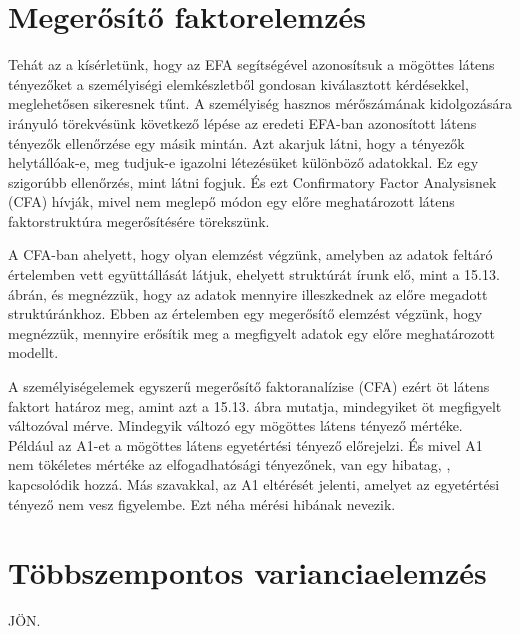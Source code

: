 \documentclass[
  letterpaper,
]{krantz}
\begin{document}

\hypertarget{sec-megerosito-faktorelemzes}{%
\chapter{Megerősítő faktorelemzés}\label{sec-megerosito-faktorelemzes}}

Tehát az a kísérletünk, hogy az EFA segítségével azonosítsuk a mögöttes
látens tényezőket a személyiségi elemkészletből gondosan kiválasztott
kérdésekkel, meglehetősen sikeresnek tűnt. A személyiség hasznos
mérőszámának kidolgozására irányuló törekvésünk következő lépése az
eredeti EFA-ban azonosított látens tényezők ellenőrzése egy másik
mintán. Azt akarjuk látni, hogy a tényezők helytállóak-e, meg tudjuk-e
igazolni létezésüket különböző adatokkal. Ez egy szigorúbb ellenőrzés,
mint látni fogjuk. És ezt Confirmatory Factor Analysisnek (CFA) hívják,
mivel nem meglepő módon egy előre meghatározott látens faktorstruktúra
megerősítésére törekszünk.

A CFA-ban ahelyett, hogy olyan elemzést végzünk, amelyben az adatok
feltáró értelemben vett együttállását látjuk, ehelyett struktúrát írunk
elő, mint a 15.13. ábrán, és megnézzük, hogy az adatok mennyire
illeszkednek az előre megadott struktúránkhoz. Ebben az értelemben egy
megerősítő elemzést végzünk, hogy megnézzük, mennyire erősítik meg a
megfigyelt adatok egy előre meghatározott modellt.

A személyiségelemek egyszerű megerősítő faktoranalízise (CFA) ezért öt
látens faktort határoz meg, amint azt a 15.13. ábra mutatja, mindegyiket
öt megfigyelt változóval mérve. Mindegyik változó egy mögöttes látens
tényező mértéke. Például az A1-et a mögöttes látens egyetértési tényező
előrejelzi. És mivel A1 nem tökéletes mértéke az elfogadhatósági
tényezőnek, van egy hibatag, , kapcsolódik hozzá. Más szavakkal, az A1
eltérését jelenti, amelyet az egyetértési tényező nem vesz figyelembe.
Ezt néha mérési hibának nevezik.


\hypertarget{sec-tobbszempontos-varianciaelemzes}{%
\chapter{Többszempontos
varianciaelemzés}\label{sec-tobbszempontos-varianciaelemzes}}

JÖN.

\end{document}
